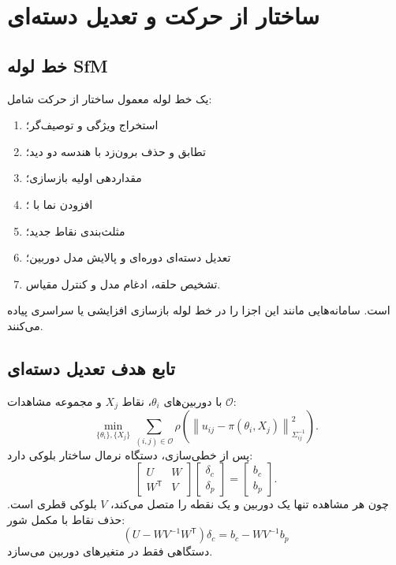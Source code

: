 \documentclass[12pt,openany,oneside]{book}
\newcommand{\norm}[1]{\left\lVert #1\right\rVert}
\newcommand{\trans}{^{\mathsf T}}
\begin{document}
\section{ساختار از حرکت و تعدیل دسته‌ای}

\subsection{خط لوله SfM}
یک خط لوله معمول ساختار از حرکت شامل:
\begin{enumerate}
\item استخراج ویژگی و توصیف‌گر؛
\item تطابق و حذف برون‌زد با هندسه دو دید؛
\item مقداردهی اولیه بازسازی؛
\item افزودن نما با ؛
\item مثلث‌بندی نقاط جدید؛
\item تعدیل دسته‌ای دوره‌ای و پالایش مدل دوربین؛
\item تشخیص حلقه، ادغام مدل و کنترل مقیاس.
\end{enumerate}
است. سامانه‌هایی مانند  این اجزا را در خط لوله بازسازی افزایشی یا سراسری پیاده می‌کنند.

\subsection{تابع هدف تعدیل دسته‌ای}
با دوربین‌های \(\theta_i\)، نقاط \(X_j\) و مجموعه مشاهدات \(\mathcal O\):
\begin{equation}
\min_{\{\theta_i\},\{X_j\}}
\sum_{(i,j)\in\mathcal O}
\rho\left(\norm{u_{ij}-\pi(\theta_i,X_j)}_{\Sigma_{ij}^{-1}}^2\right).
\label{eq:ba}
\end{equation}
پس از خطی‌سازی، دستگاه نرمال ساختار بلوکی دارد:
\begin{equation}
\begin{bmatrix}U&W\\W\trans&V\end{bmatrix}
\begin{bmatrix}\delta_c\\\delta_p\end{bmatrix}
=
\begin{bmatrix}b_c\\b_p\end{bmatrix}.
\end{equation}
چون هر مشاهده تنها یک دوربین و یک نقطه را متصل می‌کند، \(V\) بلوکی قطری است. حذف نقاط با مکمل شور:
\begin{equation}
(U-WV^{-1}W\trans)\delta_c=b_c-WV^{-1}b_p
\label{eq:schur}
\end{equation}
دستگاهی فقط در متغیرهای دوربین می‌سازد.
\end{document}
